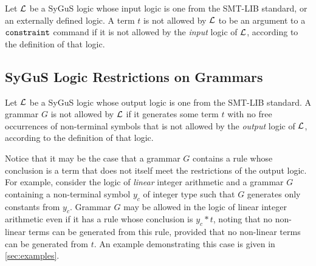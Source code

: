 \documentclass[english,a4paper,10pt]{article}
\begin{document}
Let $\mathcal{L}$ be a SyGuS logic whose input logic
is one from the SMT-LIB standard, or an externally defined logic.
A term $t$ is not allowed by $\mathcal{L}$ 
to be an argument to a $\texttt{constraint}$ command 
if it is not allowed by the \emph{input} logic of $\mathcal{L}$, 
according to the definition of that logic.



\subsection{SyGuS Logic Restrictions on Grammars}
\label{ssec:logicr-grammars}

Let $\mathcal{L}$ be a SyGuS logic whose output logic
is one from the SMT-LIB standard.
A grammar $G$ is not allowed by $\mathcal{L}$ if
it generates some term $t$ with 
no free occurrences of non-terminal
symbols that is not allowed by the \emph{output} logic of $\mathcal{L}$,
according to the definition of that logic. %

Notice that it may be the case that a grammar $G$
contains a rule whose conclusion is a term 
that does not itself meet the restrictions 
of the output logic.
For example, consider the logic of \emph{linear} integer arithmetic
and a grammar $G$ containing a non-terminal symbol $y_c$ of integer type
such that $G$ generates only constants from $y_c$.
Grammar $G$ may be allowed in the logic of linear integer arithmetic
even if it has a rule whose conclusion is $y_c * t$, 
noting that no non-linear terms can be generated from this rule,
provided that no non-linear terms can be generated from $t$.
An example demonstrating this case is given in \cref{sec:examples}.
\end{document}
